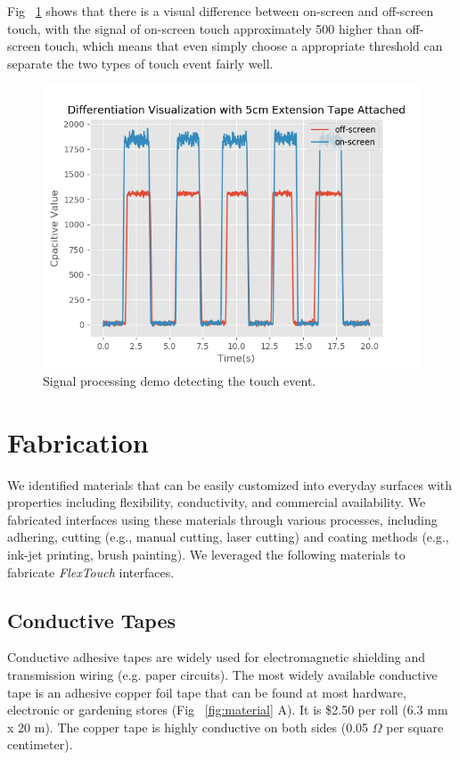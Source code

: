 Fig ~\ref{fig:diff-visual} shows that there is a visual difference between on-screen and off-screen touch, with the signal of on-screen touch approximately 500 higher than off-screen touch, which means that even simply choose a appropriate threshold can separate the two types of touch event fairly well.

\begin{figure}[ht]
  \centering
    \includegraphics[width=0.95\columnwidth]{figures/diff-visual.png}
    \setlength{\belowcaptionskip}{-6pt}
    \caption{Signal processing demo  detecting the touch event.}
    \label{fig:diff-visual}
\end{figure}

\section{Fabrication}
We identified materials that can be easily customized into everyday surfaces with properties including flexibility, conductivity, and commercial availability. We fabricated interfaces using these materials through various processes, including adhering, cutting (e.g., manual cutting, laser cutting) and coating methods (e.g., ink-jet printing, brush painting). We leveraged the following materials to fabricate \textit{FlexTouch} interfaces.

\subsection{Conductive Tapes}
Conductive adhesive tapes are widely used for electromagnetic shielding and transmission wiring (e.g. paper circuits). The most widely available conductive tape is an adhesive copper foil tape that can be found at most hardware, electronic or gardening stores (Fig ~\ref{fig:material} A). It is \$2.50 per roll (6.3 mm x 20 m). The copper tape is highly conductive on both sides (0.05 $\Omega$ per square centimeter).

